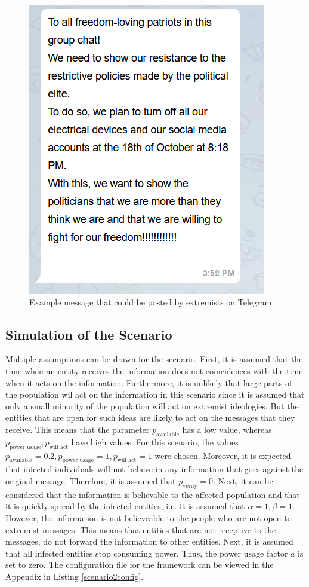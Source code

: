 \begin{figure}[!ht]
    \center
    \includegraphics[scale=.7]{figs/schwurblerchat.png}
    \caption{Example message that could be posted by extremists on Telegram}
    \label{schwurbler}
\end{figure}

\subsection{Simulation of the Scenario}
 
Multiple assumptions can be drawn for the scenario.
First, it is assumed that the time when an entity receives the
information does not coincidences with the time when it acts on the information.
Furthermore, it is unlikely that large parts of the population wil
act on the information in this scenario 
since it is assumed that only a small minority
of the population will act on extremist ideologies. But the
entities that are open for such ideas are likely to act on the 
messages that they receive.
This means that the parameter $p_{\mathrm{available}}$ has a low value,
whereas $p_{\mathrm{power\_usage}}, p_{\mathrm{will\_act}}$
have high values. For this scenario, the values 
$p_{\mathrm{available}}=0.2, 
p_{\mathrm{power\_usage}}=1, p_{\mathrm{will\_act}}=1$
were chosen.
Moreover, it is expected that infected individuals will not 
believe in any information that goes against the original message.
Therefore, it is assumed that $p_{\mathrm{verify}}=0$. Next, it
can be considered that the information is believable to 
the affected population and that it is quickly spread by 
the infected entities, i.e. it is assumed that $\alpha=1, \beta=1$.
However, the information is not believeable to the people 
who are not open to extremist messages. This means 
that entities that are not receptive to the messages, 
do not forward the information to other entities.
Next, it is assumed that all infected entities 
stop consuming power. Thus,
the power usage factor $a$ is set to zero.
The configuration file for the framework can be viewed in the Appendix in
Listing \ref{scenario2config}.

